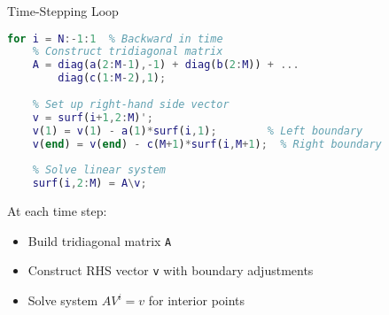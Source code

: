 \documentclass{beamer}
\begin{document}
\begin{frame}[fragile]{Time-Stepping Loop}
    \begin{lstlisting}[language=Matlab]
for i = N:-1:1  % Backward in time
    % Construct tridiagonal matrix
    A = diag(a(2:M-1),-1) + diag(b(2:M)) + ...
        diag(c(1:M-2),1);
    
    % Set up right-hand side vector
    v = surf(i+1,2:M)';
    v(1) = v(1) - a(1)*surf(i,1);        % Left boundary
    v(end) = v(end) - c(M+1)*surf(i,M+1);  % Right boundary
    
    % Solve linear system
    surf(i,2:M) = A\v;
    \end{lstlisting}
    
    At each time step:
    \begin{itemize}
        \item Build tridiagonal matrix \texttt{A}
        \item Construct RHS vector \texttt{v} with boundary adjustments
        \item Solve system $AV^i = v$ for interior points
    \end{itemize}
\end{frame}

    
    
\end{document}

